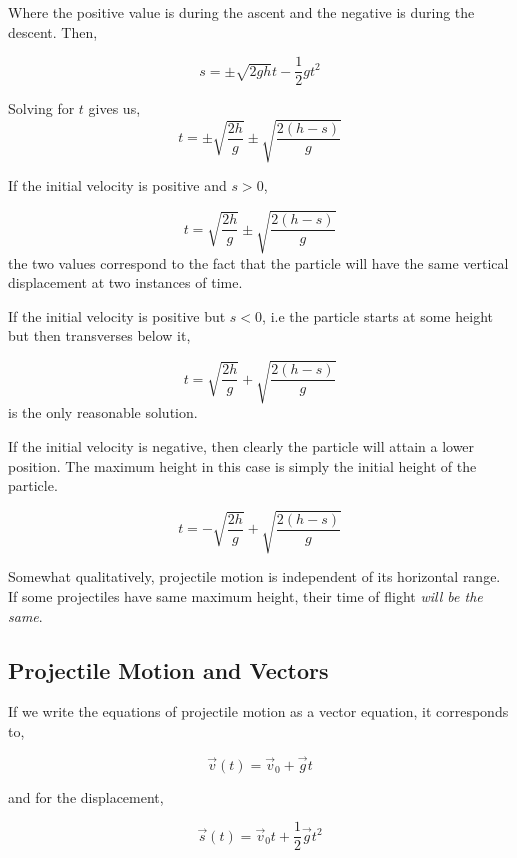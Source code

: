 Where the positive value is during the ascent and the negative is during the descent. Then,

\[s = \pm\sqrt{2gh}t - \frac{1}{2}gt^2\]

Solving for \(t\) gives us,
\[t = \pm \sqrt{\frac{2h}{g}} \pm \sqrt{\frac{2(h-s)}{g}}\]

If the initial velocity is positive and \(s > 0\), 

\begin{equation}
    t = \sqrt{\frac{2h}{g}} \pm \sqrt{\frac{2(h-s)}{g}}
\end{equation}
the two values correspond to the fact that the particle will have the same vertical
displacement at two instances of time.

If the initial velocity is positive but \(s < 0\), i.e the particle 
starts at some height but then transverses below it, 

\begin{equation}
    t = \sqrt{\frac{2h}{g}} + \sqrt{\frac{2(h-s)}{g}}
\end{equation}
is the only reasonable solution.

If the initial velocity is negative, then clearly the 
particle will attain a lower position. The maximum height in this 
case is simply the initial height of the particle.

\begin{equation}
    t = - \sqrt{\frac{2h}{g}} + \sqrt{\frac{2(h-s)}{g}}
\end{equation}

Somewhat qualitatively, projectile motion is independent of its horizontal range. 
If some projectiles have same maximum height, their time of flight \emph{will be the 
same}.

\subsection{Projectile Motion and Vectors}

If we write the equations of projectile motion as a vector equation, it 
corresponds to, 

\begin{equation*}
    \vec{v}(t) = \vec{v}_0 + \vec{g}t
\end{equation*}

and for the displacement,

\begin{equation*}
    \vec{s}(t) = \vec{v}_0t + \frac{1}{2}\vec{g}t^2
\end{equation*}

